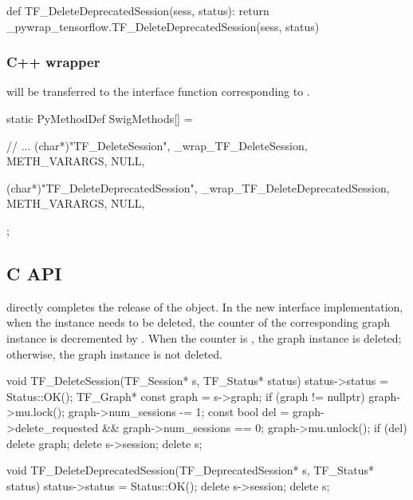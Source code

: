\begin{content}
\begin{leftbar}
\begin{python}[caption={tensorflow/bazel-bin/tensorflow/python/pywrap\_tensorflow\_internal.py}]
def TF_DeleteDeprecatedSession(sess, status):
  return _pywrap_tensorflow.TF_DeleteDeprecatedSession(sess, status)
\end{python}
\end{leftbar}

\subsubsection{C++ wrapper}

 will be transferred to the  interface function corresponding to .

\begin{leftbar}
\begin{c++}[caption={tensorflow/bazel-bin/tensorflow/python/pywrap\_tensorflow\_internal.cc}]
static PyMethodDef SwigMethods[] = {
  // ...
  { (char*)"TF_DeleteSession", 
    _wrap_TF_DeleteSession, METH_VARARGS, NULL},

  { (char*)"TF_DeleteDeprecatedSession", 
    _wrap_TF_DeleteDeprecatedSession, METH_VARARGS, NULL},
};
\end{c++}
\end{leftbar}

\subsection{C API}

 directly completes the release of the  object. In the new interface  implementation, when the  instance needs to be deleted, the counter of the corresponding graph instance is decremented by . When the counter is , the graph instance is deleted; otherwise, the graph instance is not deleted.

\begin{leftbar}
\begin{c++}[caption={tensorflow/c/c\_api.c}]
void TF_DeleteSession(TF_Session* s, TF_Status* status) {
  status->status = Status::OK();
  TF_Graph* const graph = s->graph;
  if (graph != nullptr) {
    graph->mu.lock();
    graph->num_sessions -= 1;
    const bool del = graph->delete_requested && graph->num_sessions == 0;
    graph->mu.unlock();
    if (del) delete graph;
  }
  delete s->session;
  delete s;
}

void TF_DeleteDeprecatedSession(TF_DeprecatedSession* s, TF_Status* status) {
  status->status = Status::OK();
  delete s->session;
  delete s;
}
\end{c++}
\end{leftbar}


\end{content}
